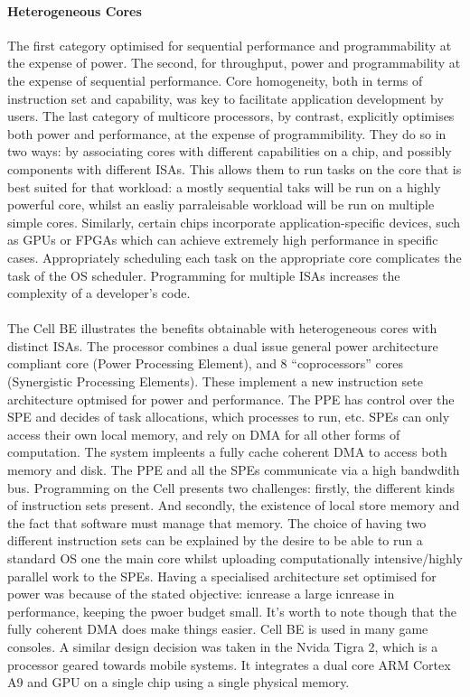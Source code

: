 \paragraph{Heterogeneous Cores} The first category optimised for 
sequential performance and programmability at the expense of power. The second, 
for throughput, power and programmability at the expense of sequential performance. 
Core homogeneity, both in terms of instruction set and capability,
was key to facilitate application development by users. The last category
of multicore processors, by contrast, explicitly optimises both
power and performance, at the expense of programmibility. They do so in two ways: 
by associating cores with different capabilities on a chip, and possibly components
with different ISAs. This allows them to run tasks on the core
that is best suited for that workload: a mostly sequential taks will be run 
on a highly powerful core, whilst an easliy parraleisable workload
will be run on multiple simple cores. Similarly, certain chips incorporate
application-specific devices, such as GPUs or FPGAs which can achieve extremely
high performance in specific cases. Appropriately scheduling each 
task on the appropriate core complicates the task of the OS scheduler.
Programming for multiple ISAs increases the complexity of a developer's code. 

\paragraph{}The Cell BE illustrates the benefits obtainable with heterogeneous
cores with distinct ISAs. The processor combines a 
dual issue general power architecture compliant core (Power Processing Element), and 8 ``coprocessors''
cores (Synergistic Processing Elements). These implement a new instruction sete
architecture optmised for power and performance.  The PPE has control over the SPE
and decides of task allocations, which processes to run, etc. SPEs can only 
access their own local memory, and rely on DMA for all other forms of computation.
The system impleents a fully cache coherent DMA to access both memory and disk. 
The PPE and all the SPEs communicate via a high bandwdith bus. 
Programming on the Cell presents two challenges: firstly, the different kinds of 
instruction sets present. And secondly, the existence of local store memory and the
fact that software must manage that memory. The choice of having two different instruction
sets can be explained by the desire to be able to run a standard OS one the main 
core whilst uploading computationally intensive/highly parallel work 
to the SPEs. Having a specialised architecture set optimised for power was
because of the stated objective: icnrease a large icnrease in performance,
keeping the pwoer budget small.  It's worth to note though that the 
fully coherent DMA does make things easier.  Cell BE is used in 
many game consoles. A similar design decision was taken in the Nvida Tigra 2, which is 
a processor geared towards mobile systems. It integrates a dual
core ARM Cortex A9 and GPU on a single chip using a single physical memory. 

